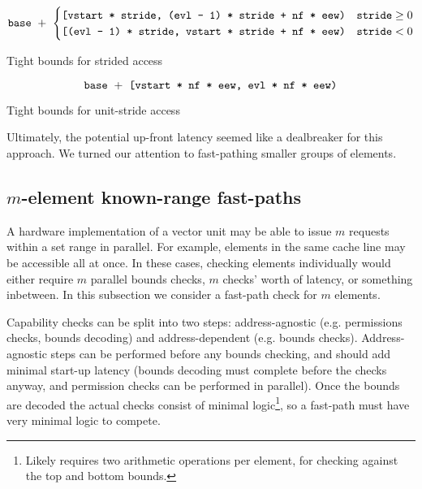 \newcommand{\vstart}{\code{vstart}}
\newcommand{\vstartactive}{\code{vstart}}
\newcommand{\evl}{\code{evl}}
\newcommand{\evlactive}{\code{evl}}
\newcommand{\baseaddr}{\code{base}}

\begin{mycapequ}[!ht]

\begin{equation}\label{eq:tightboundsstrided}
\baseaddr{}\ +\ \begin{cases}
        \code{[\vstartactive{} * \code{stride}, (\evlactive{} - 1) * \code{stride} + \code{nf} * \code{eew})} & \code{stride} \ge 0 \\
            
        \code{[(\evlactive{} - 1) * \code{stride}, \vstartactive{} * \code{stride} + \code{nf} * \code{eew})} & \code{stride} < 0
    \end{cases}
\end{equation}
\caption{Tight bounds for strided access}
\end{mycapequ}

\begin{mycapequ}[!ht]
\begin{equation}\label{eq:tightboundsunit}
    \baseaddr{}\ +\ \code{[\vstartactive{} * \code{nf} * \code{eew}, \evlactive{} * \code{nf} * \code{eew})}
\end{equation}
\caption{Tight bounds for unit-stride access}
\end{mycapequ}

Ultimately, the potential up-front latency seemed like a dealbreaker for this approach.
We turned our attention to fast-pathing smaller groups of elements.

\subsection{$m$-element known-range fast-paths}
A hardware implementation of a vector unit may be able to issue $m$ requests within a set range in parallel.
For example, elements in the same cache line may be accessible all at once.
In these cases, checking elements individually would either require $m$ parallel bounds checks, $m$ checks' worth of latency, or something inbetween.
In this subsection we consider a fast-path check for $m$ elements. 

Capability checks can be split into two steps: address-agnostic (e.g. permissions checks, bounds decoding) and address-dependent (e.g. bounds checks).
Address-agnostic steps can be performed before any bounds checking, and should add minimal start-up latency (bounds decoding must complete before the checks anyway, and permission checks can be performed in parallel).
Once the bounds are decoded the actual checks consist of minimal logic\footnote{Likely requires two arithmetic operations per element, for checking against the top and bottom bounds.}, so a fast-path must have very minimal logic to compete.

